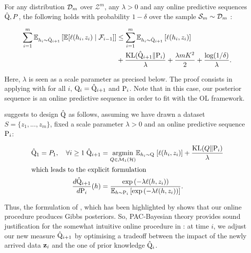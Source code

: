 \begin{corollary}
  \label{cor: online_procedure}
  For any distribution $\Dm$ over $\mathcal{Z}^m$, any $\lambda>0$ and any online predictive sequences $\hat{\Q},P$, the following holds with probability $1-\delta$ over the sample $\Sm\sim\Dm$ :

  \begin{align*}
    \sum_{i=1}^m \mathbb{E}_{h_i\sim \hat{\Q}_{i+1}}\left[ \mathbb{E}[\ell(h_i,z_i) \mid \mathcal{F}_{i-1}]    \right] & \leq \sum_{i=1}^m \mathbb{E}_{h_i\sim \hat{\Q}_{i+1}}\left[ \ell(h_i,z_i) \right] \\
    & + \frac{\operatorname{KL}(\hat{\Q}_{i+1}\| \P_{i})}{\lambda} + \frac{\lambda m K^2}{2} + \frac{\log(1/\delta)}{\lambda}.
  \end{align*}
\end{corollary}
Here, $\lambda$ is seen as a scale parameter as precised below.
The proof consists in applying  with for all $i$, $\Q_{i}= \hat{\Q}_{i+1}$ and $\P_{i}$.
Note that in this case, our posterior sequence is an online predictive sequence in order to fit with the OL framework.


 suggests to design $\hat{\Q}$ as follows, assuming we have drawn a dataset $S= \{z_1,...,z_m\}$, fixed a scale parameter $\lambda>0$  and an online predictive sequence $\P_{i}$:

\begin{align}
  \label{eq: pacb_online_alg}
  \hat{\Q}_1= P_1, \quad \forall i\geq1\; \hat{\Q}_{i+1}&= \underset{Q\in\mathcal{M}_1(\mathcal{H})}{\mathrm{argmin}} \mathbb{E}_{h_i\sim \Q} \; [\ell(h_i,z_i)] + \frac{\operatorname{KL}(Q\| \P_{i})}{\lambda} \\
  \intertext{which leads to the explicit formulation}
  \label{eq: catoni_formulation}
  \frac{d\hat{\Q}_{i+1}}{d\P_{i}}(h)& = \frac{\exp\left(-\lambda \ell(h,z_i)\right)}{\mathbb{E}_{h\sim \P_{i}}\left[\exp\left(-\lambda \ell(h,z_i)\right)\right]}.
\end{align}

  Thus, the formulation of , which has been highlighted by \citet[Sec. 5.1]{catoni2003pac} shows that our online procedure produces Gibbs posteriors.
 So, PAC-Bayesian theory provides sound justification for the somewhat intuitive online procedure in : at time $i$, we adjust our new measure $\hat{\Q}_{i+1}$ by optimising a tradeoff between the impact of the newly arrived data $\z_i$ and the one of prior knowledge $\hat{\Q}_i$.


